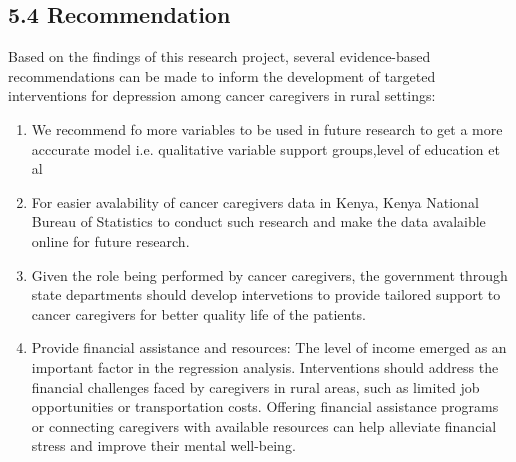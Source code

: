 \documentclass[12pt]{article}
\begin{document}
	\newpage
	\subsection*{5.4 Recommendation}
	Based on the findings of this research project, several evidence-based recommendations can be made to inform the development of targeted interventions for depression among cancer caregivers in rural settings:\\
	\begin{enumerate}
		\item We recommend fo more variables to be used in future research to get a more acccurate model i.e. qualitative variable support groups,level of education et al \\
		
		\item For easier avalability of cancer caregivers data in Kenya, Kenya National Bureau  of Statistics to conduct such research and make the data avalaible online for future research.\\
		
		\item Given the role being performed by cancer caregivers, the government through state departments should develop intervetions to provide tailored support to cancer caregivers for better quality life of the patients.\\  
		
		\item Provide financial assistance and resources: The level of income emerged as an important factor in the regression analysis. Interventions should address the financial challenges faced by caregivers in rural areas, such as limited job opportunities or transportation costs. Offering financial assistance programs or connecting caregivers with available resources can help alleviate financial stress and improve their mental well-being.\\
		
		
		
		
	\end{enumerate}
	
	
	
\end{document}
